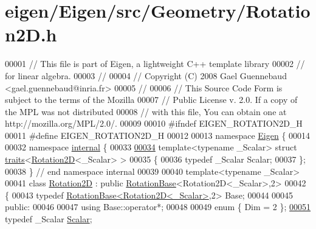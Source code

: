 \hypertarget{eigen_2_eigen_2src_2_geometry_2_rotation2_d_8h_source}{}\section{eigen/\+Eigen/src/\+Geometry/\+Rotation2D.h}
\label{eigen_2_eigen_2src_2_geometry_2_rotation2_d_8h_source}

\begin{DoxyCode}
00001 \textcolor{comment}{// This file is part of Eigen, a lightweight C++ template library}
00002 \textcolor{comment}{// for linear algebra.}
00003 \textcolor{comment}{//}
00004 \textcolor{comment}{// Copyright (C) 2008 Gael Guennebaud <gael.guennebaud@inria.fr>}
00005 \textcolor{comment}{//}
00006 \textcolor{comment}{// This Source Code Form is subject to the terms of the Mozilla}
00007 \textcolor{comment}{// Public License v. 2.0. If a copy of the MPL was not distributed}
00008 \textcolor{comment}{// with this file, You can obtain one at http://mozilla.org/MPL/2.0/.}
00009 
00010 \textcolor{preprocessor}{#ifndef EIGEN\_ROTATION2D\_H}
00011 \textcolor{preprocessor}{#define EIGEN\_ROTATION2D\_H}
00012 
00013 \textcolor{keyword}{namespace }\hyperlink{namespace_eigen}{Eigen} \{ 
00014 
00032 \textcolor{keyword}{namespace }\hyperlink{namespaceinternal}{internal} \{
00033 
\hyperlink{struct_eigen_1_1internal_1_1traits_3_01_rotation2_d_3_01___scalar_01_4_01_4}{00034} \textcolor{keyword}{template}<\textcolor{keyword}{typename} \_Scalar> \textcolor{keyword}{struct }\hyperlink{struct_eigen_1_1internal_1_1traits}{traits}<\hyperlink{group___geometry___module_class_eigen_1_1_rotation2_d}{Rotation2D}<\_Scalar> >
00035 \{
00036   \textcolor{keyword}{typedef} \_Scalar Scalar;
00037 \};
00038 \} \textcolor{comment}{// end namespace internal}
00039 
00040 \textcolor{keyword}{template}<\textcolor{keyword}{typename} \_Scalar>
00041 \textcolor{keyword}{class }\hyperlink{group___geometry___module_class_eigen_1_1_rotation2_d}{Rotation2D} : \textcolor{keyword}{public} \hyperlink{class_eigen_1_1_rotation_base}{RotationBase}<Rotation2D<\_Scalar>,2>
00042 \{
00043   \textcolor{keyword}{typedef} \hyperlink{class_eigen_1_1_rotation_base}{RotationBase<Rotation2D<\_Scalar>},2> Base;
00044 
00045 \textcolor{keyword}{public}:
00046 
00047   \textcolor{keyword}{using} Base::operator*;
00048 
00049   \textcolor{keyword}{enum} \{ Dim = 2 \};
\hyperlink{group___geometry___module_ac20c665ece0f197a712a2a39ae72e4e4}{00051}   \textcolor{keyword}{typedef} \_Scalar \hyperlink{group___geometry___module_ac20c665ece0f197a712a2a39ae72e4e4}{Scalar};

\end{DoxyCode}
